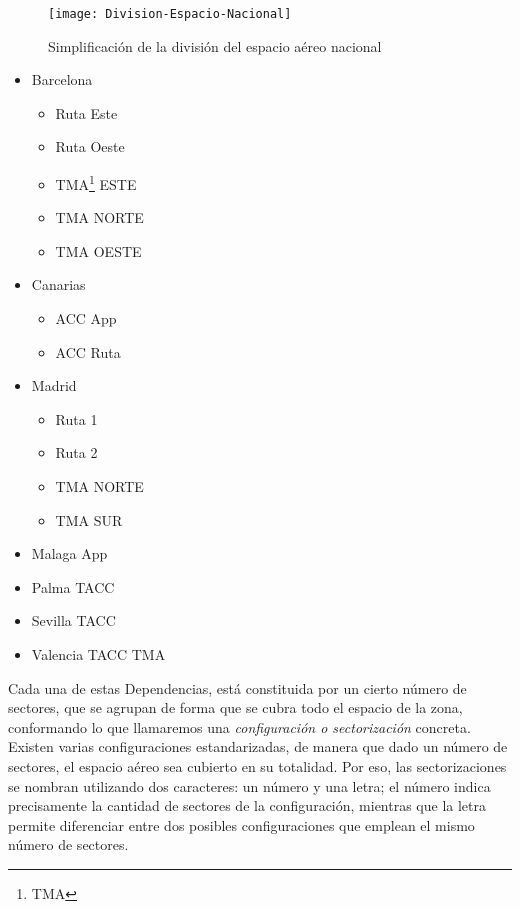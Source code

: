 \begin{figure}
    \centering
    \texttt{[image: Division-Espacio-Nacional]}
    \caption{Simplificación de la división del espacio aéreo nacional}
    \label{fig:2:regiones}
\end{figure}

\begin{itemize}
    \item Barcelona
    \begin{itemize}
        \item Ruta Este
        \item Ruta Oeste
        \item TMA\footnote{\acrlong{TMA}} ESTE
        \item TMA NORTE
        \item TMA OESTE
    \end{itemize}
    \item Canarias
    \begin{itemize}
        \item ACC App
        \item ACC Ruta
    \end{itemize}
    \item Madrid
    \begin{itemize}
        \item Ruta 1
        \item Ruta 2
        \item TMA NORTE
        \item TMA SUR
    \end{itemize}
    \item Malaga App
    \item Palma TACC
    \item Sevilla TACC
    \item Valencia TACC TMA
\end{itemize}

Cada una de estas Dependencias, está constituida por un cierto número de sectores, que se agrupan de forma que se cubra todo el espacio de la zona, conformando lo que llamaremos una \textit{configuración o sectorización} concreta.
Existen varias configuraciones estandarizadas, de manera que dado un número de sectores, el espacio aéreo sea cubierto  en su totalidad.
Por eso, las sectorizaciones se nombran utilizando dos caracteres: un número y una letra; el número indica precisamente la cantidad de sectores de la configuración, mientras que la letra permite diferenciar entre dos posibles 
configuraciones que emplean el mismo número de sectores.
\\

